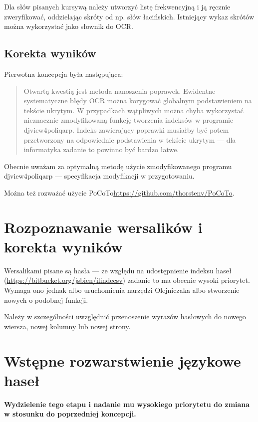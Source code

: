 \documentclass[12]{mwart}
\newcommand{\program}[1]{\textsf{#1}}
\begin{document}
Dla słów pisanych kursywą należy utworzyć listę frekwencyjną i ją
ręcznie zweryfikować, oddzielając skróty od np. słów łacińskich.
Istniejący wykaz skrótów można wykorzystać jako słownik do OCR.

\subsection{Korekta wyników}
\label{sec:korekta-wynikow}

Pierwotna koncepcja była następująca:

\begin{quote}
  Otwartą kwestią jest metoda nanoszenia poprawek. Ewidentne
  systematyczne błędy OCR można korygować globalnym podstawieniem na
  tekście ukrytym. W przypadkach wątpliwych można chyba wykorzystać
  nieznacznie zmodyfikowaną funkcję tworzenia indeksów w programie
  \program{djview4poliqarp}.  Indeks zawierający poprawki musiałby być
  potem przetworzony na odpowiednie podstawienia w tekście ukrytym ---
  dla informatyka zadanie to powinno być bardzo łatwe.
\end{quote}

Obecnie uważam za optymalną metodę użycie zmodyfikowanego programu
\program{djview4poliqarp} --- specyfikacja modyfikacji w
przygotowaniu.

Można też rozważać użycie
\textsf{PoCoTo}\url{https://github.com/thorstenv/PoCoTo}.

\section{Rozpoznawanie wersalików i korekta wyników}
\label{sec:rozp-wers-i}

Wersalikami pisane są hasła --- ze względu na udostępnienie indeksu
haseł (\url{https://bitbucket.org/jsbien/ilindecsv}) zadanie to ma
obecnie wysoki priorytet. Wymaga ono jednak albo uruchomienia narzędzi
Olejniczaka albo stworzenie nowych o podobnej funkcji.

Należy w szczególności uwzględnić przenoszenie wyrazów hasłowych do
nowego wiersza, nowej kolumny lub nowej strony.

\section{Wstępne rozwarstwienie językowe haseł}
\label{sec:wstpne-rozw-jzyk}

\textbf{Wydzielenie tego etapu i nadanie mu wysokiego priorytetu do zmiana w
stosunku do poprzedniej koncepcji.}
\end{document}
